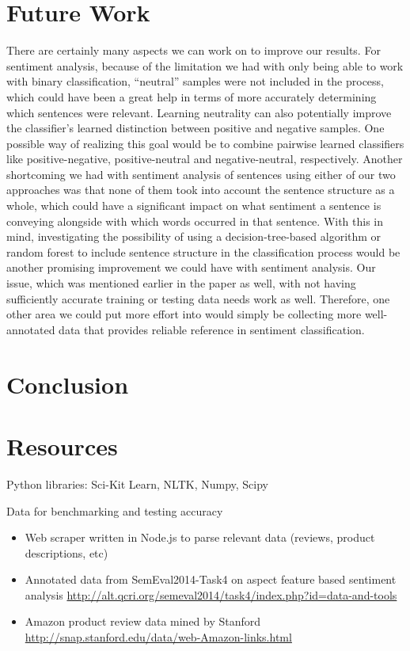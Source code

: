 \documentclass{article}
\begin{document}
\section{Future Work}
There are certainly many aspects we can work on to improve our results. For sentiment analysis, because of the limitation we had with only being able to work with binary classification, “neutral” samples were not included in the process, which could have been a great help in terms of more accurately determining which sentences were relevant. Learning neutrality can also potentially improve the classifier’s learned distinction between positive and negative samples. One possible way of realizing this goal would be to combine pairwise learned classifiers like positive-negative, positive-neutral and negative-neutral,
respectively. Another shortcoming we had with sentiment analysis of sentences using either of our two approaches was that none of them took into account the sentence structure as a whole, which could have a significant impact on what sentiment a sentence is conveying alongside with which words occurred in that sentence. With this in mind, investigating the possibility of using a decision-tree-based algorithm or random forest to include sentence structure in the classification process would be another promising improvement we could have with sentiment analysis. Our issue, which was mentioned earlier in the paper as well, with not having sufficiently accurate training or testing data needs work as well. Therefore, one other area we could put more effort into would simply be collecting more well-annotated data that provides reliable reference in sentiment classification.

\section{Conclusion}
\section{Resources}

Python libraries: Sci-Kit Learn, NLTK, Numpy, Scipy

Data for benchmarking and testing accuracy

\begin{itemize}
\item Web scraper written in Node.js to parse relevant data (reviews, product descriptions, etc)
\newline 

\item Annotated data from SemEval2014-Task4 on aspect feature based sentiment analysis
\newline
\url{http://alt.qcri.org/semeval2014/task4/index.php?id=data-and-tools}

\item Amazon product review data mined by Stanford
\newline
\url{http://snap.stanford.edu/data/web-Amazon-links.html}
\end{itemize}
\end{document}
